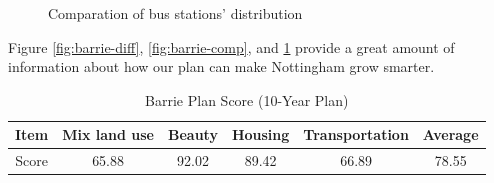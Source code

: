 \begin{figure}[htb]
  \label{fig:barrie-bus-comp}
  \centering
  \caption{Comparation of bus stations' distribution}
\end{figure}
Figure \ref{fig:barrie-diff}, \ref{fig:barrie-comp}, and \ref{fig:barrie-bus-comp} provide a great amount of information about how our plan can make Nottingham grow smarter.\\
\begin{table}[t]
\centering
  \begin{tabular}{c|cccc|c}
    \hline
    Item & Mix land use & Beauty & Housing & Transportation & Average \\
    \hline
    Score & 65.88 & 92.02 & 89.42 & 66.89 & 78.55 \\
    \hline
  \end{tabular}
  \caption{Barrie Plan Score (10-Year Plan)}
  \label{tab:barrie-model-score}
\end{table}

